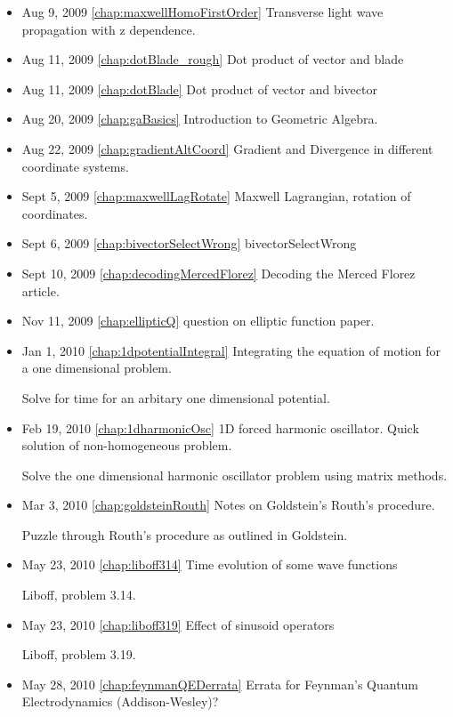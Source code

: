\begin{itemize}
\item Aug 9, 2009 \ref{chap:maxwellHomoFirstOrder} Transverse light wave propagation with z dependence.

\item Aug 11, 2009 \ref{chap:dotBlade_rough} Dot product of vector and blade

\item Aug 11, 2009 \ref{chap:dotBlade} Dot product of vector and bivector

\item Aug 20, 2009 \ref{chap:gaBasics} Introduction to Geometric Algebra.

\item Aug 22, 2009 \ref{chap:gradientAltCoord} Gradient and Divergence in different coordinate systems.

\item Sept 5, 2009 \ref{chap:maxwellLagRotate} Maxwell Lagrangian, rotation of coordinates.

\item Sept 6, 2009 \ref{chap:bivectorSelectWrong} bivectorSelectWrong

\item Sept 10, 2009 \ref{chap:decodingMercedFlorez} Decoding the Merced Florez article.

\item Nov 11, 2009 \ref{chap:ellipticQ} question on elliptic function paper.

\item Jan 1, 2010 \ref{chap:1dpotentialIntegral} Integrating the equation of motion for a one dimensional problem.

Solve for time for an arbitary one dimensional potential.\item Feb 19, 2010 \ref{chap:1dharmonicOsc} 1D forced harmonic oscillator.  Quick solution of non-homogeneous problem.

Solve the one dimensional harmonic oscillator problem using matrix methods.\item Mar 3, 2010 \ref{chap:goldsteinRouth} Notes on Goldstein's Routh's procedure.

Puzzle through Routh's procedure as outlined in Goldstein.\item May 23, 2010 \ref{chap:liboff314} Time evolution of some wave functions

Liboff, problem 3.14.\item May 23, 2010 \ref{chap:liboff319} Effect of sinusoid operators

Liboff, problem 3.19.\item May 28, 2010 \ref{chap:feynmanQEDerrata} Errata for Feynman's Quantum Electrodynamics (Addison-Wesley)?


\end{itemize}
